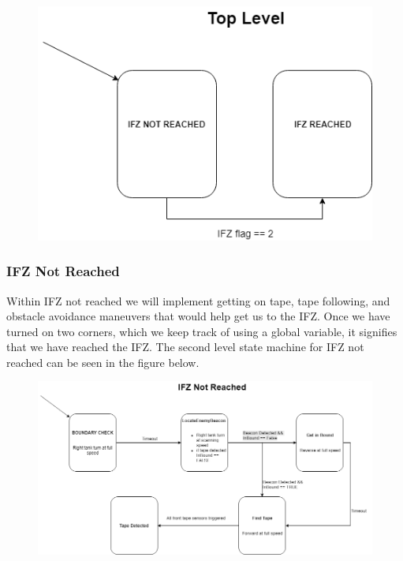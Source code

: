 \documentclass{article}
\begin{document}
\begin{figure}[H]
    \centering
    \includegraphics[scale = 0.5]{TopLevel.png}
\end{figure}

\subsubsection{IFZ Not Reached}
Within IFZ not reached we will implement getting on tape, tape following, and obstacle avoidance maneuvers that would help get us to the IFZ.  Once we have turned on two corners, which we keep track of using a global variable, it signifies that we have reached the IFZ.  The second level state machine for IFZ not reached can be seen in the figure below.

\begin{figure}[H]
    \centering
    \includegraphics[scale = 0.5]{IFZ_NOT_REACHED.png}
\end{figure}
\end{document}
